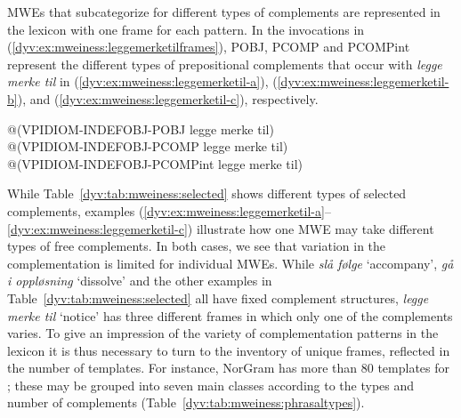 \documentclass[output=paper]{langsci/langscibook}
\begin{document}
MWEs that subcategorize for different types of complements are represented in the lexicon with one frame for each  pattern.
In the  invocations in (\ref{dyv:ex:mweiness:leggemerketilframes}), \textsf{POBJ}, \textsf{PCOMP} and \textsf{PCOMPint} represent the different types of prepositional complements that occur with \emph{legge merke til} in (\ref{dyv:ex:mweiness:leggemerketil-a}), (\ref{dyv:ex:mweiness:leggemerketil-b}), and (\ref{dyv:ex:mweiness:leggemerketil-c}), respectively.

\ea\label{dyv:ex:mweiness:leggemerketilframes}
\begin{xlist}
\ex \label{dyv:ex:mweiness:leggemerketilframes-a}\textsf{@(VPIDIOM-INDEFOBJ-POBJ legge merke til)} \\ 
\ex \label{dyv:ex:mweiness:leggemerketilframes-b}\textsf{@(VPIDIOM-INDEFOBJ-PCOMP  legge merke til)} \\
\ex \label{dyv:ex:mweiness:leggemerketilframes-c}\textsf{@(VPIDIOM-INDEFOBJ-PCOMPint legge merke til)} \\
\end{xlist}
\z	


While Table~\ref{dyv:tab:mweiness:selected} shows different types of selected complements, examples (\ref{dyv:ex:mweiness:leggemerketil-a}--\ref{dyv:ex:mweiness:leggemerketil-c}) illustrate how one MWE may take different types of free complements.
In both cases, we see that variation in the complementation is limited for individual MWEs.
While \emph{slå følge} `accompany', \emph{gå i oppløsning} `dissolve' and the other examples in Table~\ref{dyv:tab:mweiness:selected} all have fixed complement structures, \emph{legge merke til} `notice' has three different frames in which only one of the complements varies.
To give an impression of the variety of complementation patterns in the lexicon it is thus necessary to turn to the inventory of unique frames, reflected in the number of templates.
For instance, NorGram has more than 80 templates for ; these may be grouped into seven main classes according to the types and number of complements (Table~\ref{dyv:tab:mweiness:phrasaltypes}). %
\end{document}
